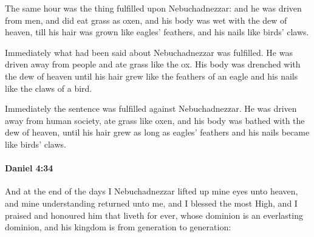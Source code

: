 			\begin{versebox}
					\item[BHS] 
					\item[LXX] 
					\item[ASV] The same hour was the thing fulfilled upon Nebuchadnezzar: and he was driven from men, and did eat grass as oxen, and his body was wet with the dew of heaven, till his hair was grown like eagles' feathers, and his nails like birds' claws.
					\item[NIV] Immediately what had been said about Nebuchadnezzar was fulfilled. He was driven away from people and ate grass like the ox. His body was drenched with the dew of heaven until his hair grew like the feathers of an eagle and his nails like the claws of a bird.
					\item[NRSV] Immediately the sentence was fulfilled against Nebuchadnezzar. He was driven away from human society, ate grass like oxen, and his body was bathed with the dew of heaven, until his hair grew as long as eagles’ feathers and his nails became like birds’ claws.
			\end{versebox}

		\paragraph{Daniel 4:34} %
			\label{DANIEL-4-34}

			And at the end of the days I Nebuchadnezzar lifted up mine eyes unto heaven, and mine understanding returned unto me, and I blessed the most High, and I praised and honoured him that liveth for ever, whose dominion is an everlasting dominion, and his kingdom is from generation to generation:

